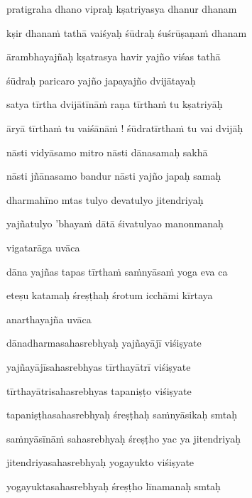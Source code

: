 pratigraha dhano vipraḥ kṣatriyasya dhanur dhanam\thinspace{\dandab} \dontdisplaylinenum

kṣir dhana\.m tathā vaiśyaḥ śūdraḥ śuśrūṣaṇa\.m dhanam \veg\dontdisplaylinenum

ārambhayajñaḥ kṣatrasya havir yajño viśas tathā\thinspace{\dandab} \dontdisplaylinenum

śūdraḥ paricaro yajño japayajño dvijātayaḥ \veg\dontdisplaylinenum

satya tīrtha dvijātīnā\.m raṇa tīrtha\.m tu kṣatriyāḥ\thinspace{\dandab} \dontdisplaylinenum

āryā tīrtha\.m tu vaiśānā\.m ! śūdratīrtha\.m tu vai dvijāḥ \veg\dontdisplaylinenum

nāsti vidyāsamo mitro nāsti dānasamaḥ sakhā\thinspace{\dandab} \dontdisplaylinenum

nāsti jñānasamo bandur nāsti yajño japaḥ samaḥ \veg\dontdisplaylinenum

dharmahīno mtas tulyo devatulyo jitendriyaḥ\thinspace{\dandab} \dontdisplaylinenum

yajñatulyo 'bhaya\.m dātā śivatulyao manonmanaḥ \veg\dontdisplaylinenum

vigatarāga uvāca~{\dandab}\dontdisplaylinenum 

dāna yajñas tapas tīrtha\.m sa\.mnyāsa\.m yoga eva ca\thinspace{\danda} \dontdisplaylinenum

eteṣu katamaḥ śreṣṭhaḥ śrotum icchāmi kīrtaya \veg\dontdisplaylinenum

anarthayajña uvāca~{\dandab}\dontdisplaylinenum 

dānadharmasahasrebhyaḥ yajñayājī viśiṣyate\thinspace{\danda} \dontdisplaylinenum

yajñayājīsahasrebhyas tīrthayātrī viśiṣyate \veg\dontdisplaylinenum

tīrthayātrisahasrebhyas tapaniṣṭo viśiṣyate\thinspace{\dandab} \dontdisplaylinenum

tapaniṣṭhasahasrebhyaḥ śreṣṭhaḥ sa\.mnyāsikaḥ smtaḥ \veg\dontdisplaylinenum

sa\.mnyāsīnā\.m sahasrebhyaḥ śreṣṭho yac ya jitendriyaḥ\thinspace{\dandab} \dontdisplaylinenum

jitendriyasahasrebhyaḥ yogayukto viśiṣyate \veg\dontdisplaylinenum

yogayuktasahasrebhyaḥ śreṣṭho līnamanaḥ smtaḥ\thinspace{\dandab} \dontdisplaylinenum

